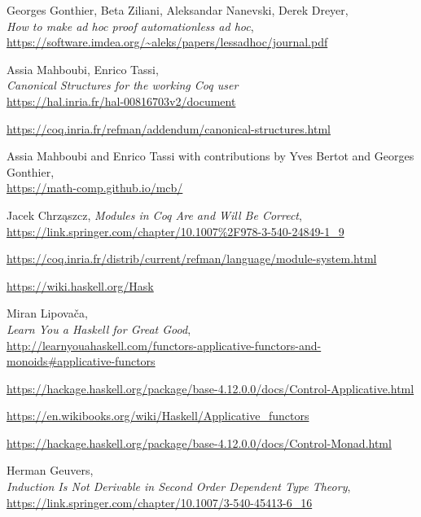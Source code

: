 \documentclass[declaration,inz,english,shortabstract]{iithesis}
\begin{document}
\begin{thebibliography}{1}
        Georges Gonthier, Beta Ziliani, Aleksandar Nanevski, Derek Dreyer, \\
        \textit{How to make ad hoc proof automationless ad hoc}, \\
        \url{https://software.imdea.org/~aleks/papers/lessadhoc/journal.pdf}

        Assia Mahboubi, Enrico Tassi, \\
        \textit{Canonical Structures for the working Coq user} \\
        \url{https://hal.inria.fr/hal-00816703v2/document}

        \url{https://coq.inria.fr/refman/addendum/canonical-structures.html}

        Assia Mahboubi and Enrico Tassi with contributions by Yves Bertot and Georges Gonthier, \\
        \url{https://math-comp.github.io/mcb/}

        Jacek Chrząszcz,
        \textit{Modules in Coq Are and Will Be Correct}, \\
        \url{https://link.springer.com/chapter/10.1007%2F978-3-540-24849-1_9}

        \url{https://coq.inria.fr/distrib/current/refman/language/module-system.html}

        \url{https://wiki.haskell.org/Hask}

        Miran Lipovača, \\
        \textit{Learn You a Haskell for Great Good}, \\
        \url{http://learnyouahaskell.com/functors-applicative-functors-and-monoids#applicative-functors}

        \url{https://hackage.haskell.org/package/base-4.12.0.0/docs/Control-Applicative.html}

        \url{https://en.wikibooks.org/wiki/Haskell/Applicative_functors}

        \url{https://hackage.haskell.org/package/base-4.12.0.0/docs/Control-Monad.html}

        Herman Geuvers, \\
        \textit{Induction Is Not Derivable in Second Order Dependent Type Theory}, \\
        \url{https://link.springer.com/chapter/10.1007/3-540-45413-6_16}


\end{thebibliography}
\end{document}

